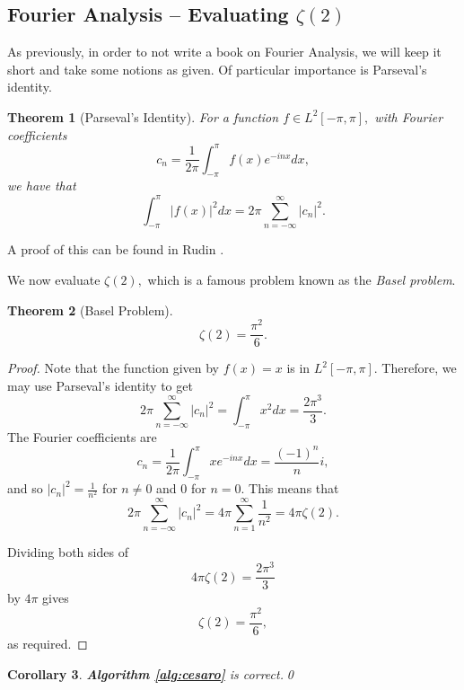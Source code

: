 \documentclass[11pt]{article}
\newcommand{\abs}[1]{\left|#1\right|}
\newcommand{\upright}[1]{{\bf \ttfamily #1}}
\newtheorem{theorem}{Theorem}
\newtheorem{corollary}[theorem]{Corollary}
\begin{document}
\subsection*{Fourier Analysis -- Evaluating $\zeta\left(2\right)$}
As previously, in order to not write a book on Fourier Analysis, we will keep it short and take some notions as given. Of particular importance is Parseval's identity.

\begin{theorem}[Parseval's Identity]
For a function $f\in L^{2}\left[-\pi, \pi\right],$ with Fourier coefficients $$c_{n} = \frac{1}{2\pi}\int_{-\pi}^{\pi} f\left(x\right) e^{-inx}dx,$$ we have that $$\int_{-\pi}^{\pi}\abs{f\left(x\right)}^{2} dx = 2\pi\sum_{n = -\infty}^{\infty}\abs{c_{n}}^{2}.$$
\end{theorem}

A proof of this can be found in Rudin \cite{rudin_1976}.

We now evaluate $\zeta\left(2\right),$ which is a famous problem known as the {\it Basel problem}.

\begin{theorem}[Basel Problem]
$$\zeta\left(2\right) = \frac{\pi^{2}}{6}.$$
\end{theorem}
\begin{proof}
Note that the function given by $f\left(x\right) = x$ is in $L^{2}\left[-\pi, \pi\right].$ Therefore, we may use Parseval's identity to get $$2\pi\sum_{n=-\infty}^{\infty}\abs{c_{n}}^2 = \int_{-\pi}^{\pi}x^{2} dx = \frac{2\pi^{3}}{3}.$$ The Fourier coefficients are $$c_{n} = \frac{1}{2\pi}\int_{-\pi}^{\pi} xe^{-inx}dx = \frac{\left(-1\right)^{n}}{n}i,$$ and so $\abs{c_{n}}^{2} = \frac{1}{n^{2}}$ for $n\neq 0$ and $0$ for $n = 0$. This means that $$2\pi\sum_{n=-\infty}^{\infty}\abs{c_{n}}^2 = 4\pi\sum_{n=1}^{\infty}\frac{1}{n^{2}} = 4\pi\zeta\left(2\right).$$

Dividing both sides of $$4\pi\zeta\left(2\right) = \frac{2\pi^{3}}{3}$$ by $4\pi$ gives $$\zeta\left(2\right) = \frac{\pi^{2}}{6},$$ as required.
\end{proof}

\begin{corollary}
\upright{Algorithm \ref{alg:cesaro}} is correct.\qed
\end{corollary}



\end{document}
